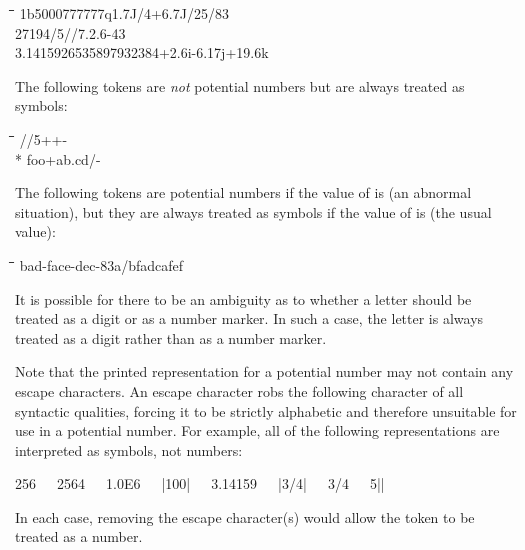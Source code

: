 \begin{lisp}
\linewidth\=\linewidth\=\linewidth\=\linewidth\=\kill
1b5000\>777777q\>1.7J/4+6.7J/25/83 \\
27{\Xcircumflex}194/5//7.2.6\>{\Xcircumflex}-43{\Xcircumflex} \\
3.141{\Xunderscore}592{\Xunderscore}653{\Xunderscore}589{\Xunderscore}793{\Xunderscore}238{\Xunderscore}4\>\>+2.6i-6.17j+19.6k
\end{lisp}
The following tokens are \emph{not} potential numbers but are always
treated as symbols:
\begin{lisp}
\linewidth\=\linewidth\=\linewidth\=\linewidth\=\kill
/\>/5\>++- \\*
foo+\>ab.cd\>{\Xunderscore}\>{\Xcircumflex}\>{\Xcircumflex}/-
\end{lisp}
The following tokens are potential numbers if the value of
 is  (an abnormal situation), but they are
always treated as symbols if the value of 
is  (the usual value):
\begin{lisp}
\linewidth\=\linewidth\=\linewidth\=\linewidth\=\kill
bad-face-dec-83\>a/b\>fad{\Xunderscore}cafe\>f{\Xcircumflex}
\end{lisp}
It is possible for there to be an ambiguity as to whether
a letter should be treated as a digit or as a number marker.
In such a case, the letter is always treated as a digit
rather than as a number marker.

Note that the printed representation for a potential
number may not contain any escape characters.
An escape character robs the following character of all syntactic
qualities, forcing it to be strictly alphabetic and therefore unsuitable
for use in a potential number.  For example,
all of the following representations are interpreted as symbols, not numbers:
\begin{lisp}
{\Xbackslash}256~~~25{\Xbackslash}64~~~1.0{\Xbackslash}E6~~~|100|~~~3{\Xbackslash}.14159~~~|3/4|~~~3{\Xbackslash}/4~~~5||
\end{lisp}
In each case, removing the escape character(s) would allow the token
to be treated as a number.

